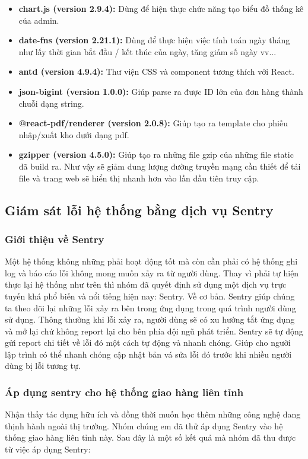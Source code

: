 			\begin{itemize}
				\item \textbf{chart.js (version 2.9.4):} Dùng để hiện thực chức năng tạo biểu đồ thống kê của admin.
				\item \textbf{date-fns (version 2.21.1):} Dùng để thực hiện việc tính toán ngày tháng như lấy thời gian bắt đầu / kết thúc của ngày, tăng giảm số ngày vv...
				\item \textbf{antd (version 4.9.4):} Thư viện CSS và component tương thích với React.
				\item \textbf{json-bigint (version 1.0.0):} Giúp parse ra được ID lớn của đơn hàng thành chuỗi dạng string.
				\item \textbf{@react-pdf/renderer (version 2.0.8):} Giúp tạo ra template cho phiếu nhập/xuất kho dưới dạng pdf.
				\item \textbf{gzipper (version 4.5.0):} Giúp tạo ra những file gzip của những file static đã build ra. Như vậy sẽ giảm dung lượng đường truyền mạng cần thiết để tải file và trang web sẽ hiển thị nhanh hơn vào lần đầu tiên truy cập.
			\end{itemize}
			
	
		\subsection{Giám sát lỗi hệ thống bằng dịch vụ Sentry}
			\subsubsection{Giới thiệu về Sentry}
				Một hệ thống không những phải hoạt động tốt mà còn cần phải có hệ thống ghi log và báo cáo lỗi không mong muốn xảy ra từ người dùng. Thay vì phải tự hiện thực lại hệ thống như trên thì nhóm đã quyết định sử dụng một dịch vụ trực tuyến khá phổ biến và nổi tiếng hiện nay: Sentry. Về cơ bản. Sentry giúp chúng ta theo dõi lại những lỗi xảy ra bên trong ứng dụng trong quá trình người dùng sử dụng. Thông thường khi lỗi xảy ra, người dùng sẽ có xu hướng tắt ứng dụng và mở lại chứ không report lại cho bên phía đội ngũ phát triển. Sentry sẽ tự động gửi report chi tiết về lỗi đó một cách tự động và nhanh chóng. Giúp cho người lập trình có thể nhanh chóng cập nhật bản vá sửa lỗi đó trước khi nhiều người dùng bị lỗi tương tự.
				
			\subsubsection{Áp dụng sentry cho hệ thống giao hàng liên tỉnh}
			 	Nhận thấy tác dụng hữu ích và đồng thời muốn học thêm những công nghệ đang thịnh hành ngoài thị trường. Nhóm chúng em đã thử áp dụng Sentry vào hệ thống giao hàng liên tỉnh này. Sau đây là một số kết quả mà nhóm đã thu được từ việc áp dụng Sentry:
			 	
